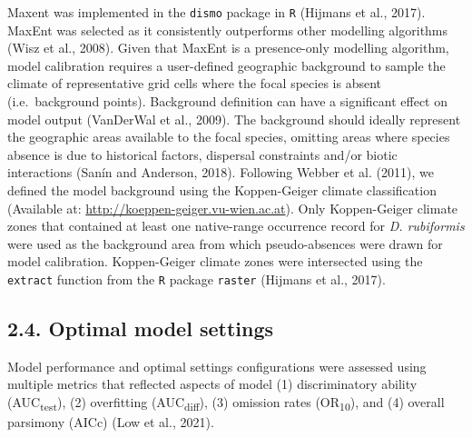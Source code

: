 \documentclass[12pt,]{article}
\begin{document}
Maxent was implemented in the \texttt{dismo} package in \texttt{R}
(Hijmans et al., 2017). MaxEnt was selected as it consistently
outperforms other modelling algorithms (Wisz et al., 2008). Given that
MaxEnt is a presence-only modelling algorithm, model calibration
requires a user-defined geographic background to sample the climate of
representative grid cells where the focal species is absent
(i.e.~background points). Background definition can have a significant
effect on model output (VanDerWal et al., 2009). The background should
ideally represent the geographic areas available to the focal species,
omitting areas where species absence is due to historical factors,
dispersal constraints and/or biotic interactions (Sanín and Anderson,
2018). Following Webber et al. (2011), we defined the model background
using the Koppen-Geiger climate classification (Available at:
\url{http://koeppen-geiger.vu-wien.ac.at}). Only Koppen-Geiger climate
zones that contained at least one native-range occurrence record for
\emph{D. rubiformis} were used as the background area from which
pseudo-absences were drawn for model calibration. Koppen-Geiger climate
zones were intersected using the \texttt{extract} function from the
\texttt{R} package \texttt{raster} (Hijmans et al., 2017).

\hypertarget{optimal-model-settings}{%
\subsection{2.4. Optimal model settings}\label{optimal-model-settings}}

Model performance and optimal settings configurations were assessed
using multiple metrics that reflected aspects of model (1)
discriminatory ability (AUC\textsubscript{test}), (2) overfitting
(AUC\textsubscript{diff}), (3) omission rates (OR\textsubscript{10}),
and (4) overall parsimony (AICc) (Low et al., 2021).
\end{document}
